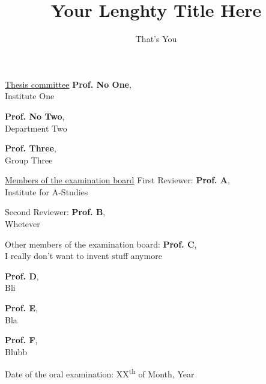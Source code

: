 \title{Your Lenghty Title Here}
\author{That's You}



\maketitle

\newpage \thispagestyle{empty}
\underline{Thesis committee}
\vskip 2.0mm
\textbf{Prof. No One}, \\
\small Institute One

\vskip 0.05cm
\normalsize \textbf{Prof. No Two}, \\
\small Department Two

\vskip 0.05cm
\normalsize \textbf{Prof. Three}, \\
\small Group Three

\vskip 4.0mm
\normalsize \underline{Members of the examination board}
\vskip 2.0mm
\normalsize First Reviewer: \textbf{Prof. A}, \\
\small Institute for A-Studies

\vskip 0.05cm
\normalsize Second Reviewer: \textbf{Prof. B}, \\
\small Whetever

\vskip 4.0mm
\normalsize Other members of the examination board:
\vskip 2.0mm
\normalsize \textbf{Prof. C}, \\
\small I really don't want to invent stuff anymore

\vskip 0.05cm
\normalsize \textbf{Prof. D}, \\
\small Bli

\vskip 0.05cm
\normalsize \textbf{Prof. E}, \\
\small Bla

\vskip 0.05cm
\normalsize \textbf{Prof. F}, \\
\small Blubb


\normalsize

\vfill
Date of the oral examination: \hfill XX\textsuperscript{th} of Month, Year

\cleardoublepage
{}\setcounter{page}{3}  
\abstractpage
\thispagestyle{empty}
\cleardoublepage

